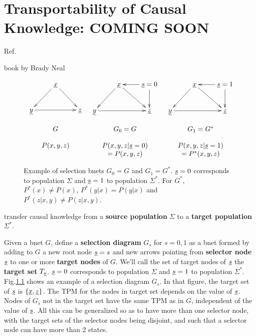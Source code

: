 \chapter{Transportability
of Causal Knowledge: COMING SOON}
\label{ch-transport}





Ref.\cite{pearl2011trans}

book by Brady Neal \cite{book-brady-neal}


\begin{figure}[h!]
$$
\begin{array}{ccc}
\xymatrix{
&\rvx\ar[dl]\ar[dr]
\\
\rvy\ar[rr]
&&\rvz
}
&
\xymatrix{
&\rvx\ar[dl]\ar[dr]
&\rvs=0\ar[l]\ar[d]
\\
\rvy\ar[rr]
&&\rvz
}
&
\xymatrix{
&\rvx\ar[dl]\ar[dr]
&\rvs=1\ar[l]\ar[d]
\\
\rvy\ar[rr]
&&\rvz
}
\\
\\
G&G_0=G
&G_1=G^*
\\
\\
P(x,y,z)
&P(x,y,z|\rvs=0)
&P(x,y,z|\rvs=1)
\\
&
=P(x,y,z)
&
=P^*(x,y,z)
\end{array}
$$
\caption{Example of selection bnets
$G_0=G$ and $G_1=G^*$.
${\underline{s}}=0$ corresponds to population $\Sigma$
and ${\underline{s}}=1$ to population $\Sigma^*$.
For $G^*$, 
$P^*(x)\neq P(x)$, $P^*(y|x)=P(y|x)$
and $P^*(z|x,y)\neq P(z|x,y)$.}
\label{fig-sel-dia}
\end{figure}


transfer causal knowledge from
a {\bf source population} $\Sigma$ to a 
{\bf target population} $\Sigma^*$.

Given a bnet $G$, define a
{\bf selection diagram} $G_s$ for $s=0,1$
as a bnet 
formed by adding to $G$ a new root node ${\underline{s}}=s$
and new arrows pointing
from {\bf selector node}
${\underline{s}}$ to one
or more {\bf target nodes} of $G$.
We'll call the set 
of target nodes 
of ${\underline{s}}$ the {\bf target set} $T_{\underline{s}}$.
${\underline{s}}=0$ corresponds to population $\Sigma$
and ${\underline{s}}=1$ to population $\Sigma^*$.
Fig.\ref{fig-sel-dia}
shows an example
of a selection diagram $G_s$.
In that figure, the target set 
of ${\underline{s}}$ is 
$\{{\underline{x}}, {\underline{z}}\}$.
The TPM for the nodes in target set 
depends on the value of ${\underline{s}}$.
Nodes of $G_s$ not in
the target set have the same TPM as in $G$,
independent of the value of ${\underline{s}}$.
All this can be generalized so as to 
have more than one selector node,
with the target sets
of the selector nodes being disjoint, and such that a
selector node
can have more than 2 states.


